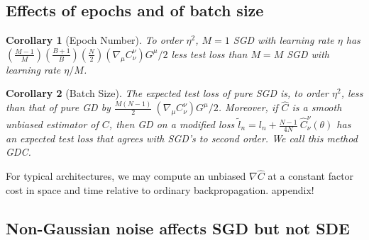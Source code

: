 \documentclass{article}
\theoremstyle{plain}
\newtheorem{cor}{Corollary}
\theoremstyle{definition}
\newcommand{\wrap}[1]{\left(#1\right)}
\newcommand{\sizeddia}[2]{
    \begin{gathered}
        \texttt{[image: ../diagrams/\#1.png]}
    \end{gathered}
}
\newcommand{\sdia}[1]{\protect \sizeddia{#1}{0.10}}
\begin{document}
    \subsection{Effects of epochs and of batch size} \label{subsect:epochs-batch}

        \begin{cor}[Epoch Number] \label{cor:epochs}
            To order $\eta^2$, $M=1$ SGD with learning rate $\eta$ has 
            $
                 \wrap{\frac{M-1}{M}}\wrap{\frac{B+1}{B}}\wrap{\frac{N}{2}}
                 \wrap{\nabla_\mu C^{\nu}_{\nu}} G^\mu / 2
            $
            less test loss than $M=M$ SGD with learning rate $\eta/M$.
        \end{cor}
    
        \begin{cor}[Batch Size] \label{cor:batch}
            The expected test loss of pure SGD is, to order $\eta^2$,
            less than that of pure GD by
            $
                  \frac{M(N-1)}{2} ~
                  \wrap{\nabla_\mu C^{\nu}_{\nu}} G^\mu / 2
            $.
            Moreover, if $\hat{C}$ is a smooth unbiased estimator of $C$, then
            GD on a modified loss 
            $
                \tilde l_n = l_n +
                    \frac{N-1}{4N} ~
                    \hat{C}_\nu^\nu(\theta)
            $
            has an expected test loss that agrees with SGD's to second order.
            We call this method GDC.
        \end{cor}
        For typical architectures, we may compute an unbiased $\nabla \hat C$
        at a constant factor cost in space and time relative to ordinary
        backpropagation.  {\color{red} appendix!}
 
    \subsection{Non-Gaussian noise affects SGD but not SDE}
\end{document}
